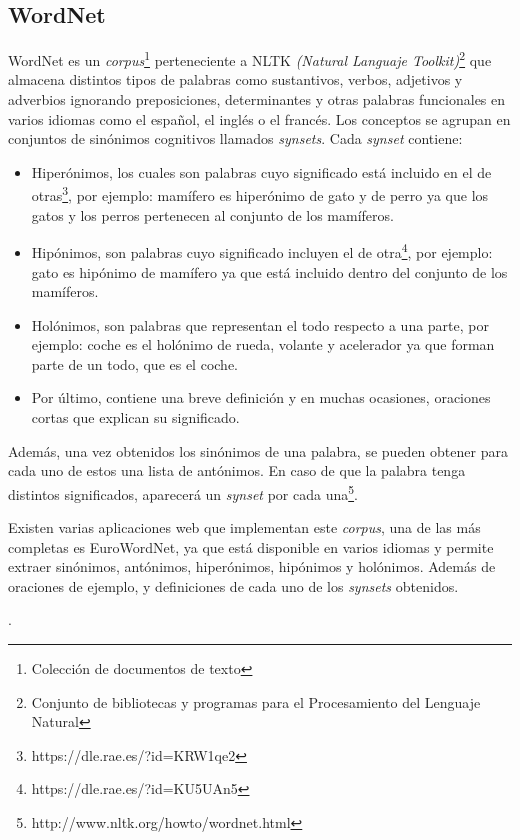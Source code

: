 \subsection{WordNet}
\label{cap:subsec:wordnet}
WordNet es un \textit{corpus}\footnote{Colección de documentos de texto} perteneciente a NLTK \textit{(Natural Languaje Toolkit)}\footnote{Conjunto de bibliotecas y programas para el Procesamiento del Lenguaje Natural} que almacena distintos tipos de palabras como sustantivos, verbos, adjetivos y adverbios ignorando preposiciones, determinantes y otras palabras funcionales en varios idiomas como el español, el inglés o el francés. Los conceptos se agrupan en conjuntos de sinónimos cognitivos llamados \textit{synsets}. Cada \textit{synset} contiene:
\begin{itemize}
	
	\item Hiperónimos, los cuales son palabras cuyo significado está incluido en el de otras\footnote{https://dle.rae.es/?id=KRW1qe2}, por ejemplo: mamífero es hiperónimo de gato y de perro ya que los gatos y los perros pertenecen al conjunto de los mamíferos.
	\item Hipónimos, son palabras cuyo significado incluyen el de otra\footnote{https://dle.rae.es/?id=KU5UAn5}, por ejemplo: gato es hipónimo de mamífero ya que está incluido dentro del conjunto de los mamíferos.
	\item Holónimos, son palabras que representan el todo respecto a una parte, por ejemplo: coche es el holónimo de rueda, volante y acelerador ya que forman parte de un todo, que es el coche.
	\item Por último, contiene una breve definición y en muchas ocasiones, oraciones cortas que explican su significado.		
\end{itemize} 
Además, una vez obtenidos los sinónimos de una palabra, se pueden obtener para cada uno de estos una lista de antónimos. En caso de que la palabra tenga distintos significados, aparecerá un \textit{synset} por cada una\footnote{http://www.nltk.org/howto/wordnet.html}.

Existen varias aplicaciones web que implementan este \textit{corpus}, una de las más completas es EuroWordNet, ya que está disponible en varios idiomas y permite extraer sinónimos, antónimos, hiperónimos, hipónimos y holónimos. Además de oraciones de ejemplo, y definiciones de cada uno de los \textit{synsets} obtenidos.


.


